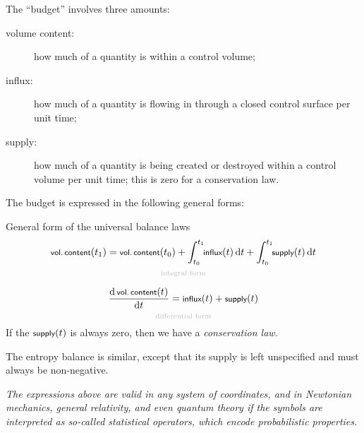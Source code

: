 \documentclass[a4paper,12pt,%
onecolumn,oneside,titlepage,%
british%
]{memoir}
\newcommand*{\di}{\mathrm{d}}%
\renewcommand*{\|}[1][]{\nonscript\:#1\vert\nonscript\:\mathopen{}}
\newcommand*{\yti}{t_{0}}
\newcommand*{\ytf}{t_{1}}
\begin{document}
The \enquote{budget} involves three amounts:
\begin{description}
\item[volume content:] how much of a quantity is within a control volume;
\item[influx:] how much of a quantity is flowing in through a closed control surface per unit time;
\item[supply:] how much of a quantity is being created or destroyed within a control volume per unit time; this is zero for a conservation law.
\end{description}

The budget is expressed in the following general forms:
\begin{definition}{General form of the universal balance laws}
  \begin{equation*}
    \begin{gathered}[t]
      \underbracket[0pt]{\textsf{\footnotesize vol.\,content}(\ytf) = \textsf{\footnotesize vol.\,content}(\yti) + \int_{\yti}^{\ytf}\!\!\textsf{\footnotesize influx}(t)\,\di t + \int_{\yti}^{\ytf}\!\!\textsf{\footnotesize supply}(t)\,\di t}_{\mathclap{\text{\color{grey}integral form}}}
      \\[2\jot]
      \underbracket[0pt]{\frac{\di\,\textsf{\footnotesize vol.\,content}(t)}{\di t} = \textsf{\footnotesize influx}(t) + \textsf{\footnotesize supply}(t)}_{\mathclap{\text{\color{grey}differential form}}}
    \end{gathered}
  \end{equation*}
  If the $\textsf{\footnotesize supply}(t)$ is always zero, then we have a \emph{conservation law}.

  \smallskip

    The entropy balance is similar, except that its supply is left unspecified and must always be non-negative.

      \smallskip

  \emph{The expressions above are valid in any system of coordinates, and in Newtonian mechanics, general relativity, and even quantum theory if the symbols are interpreted as so-called statistical operators, which encode probabilistic properties.}
\end{definition}
\end{document}
